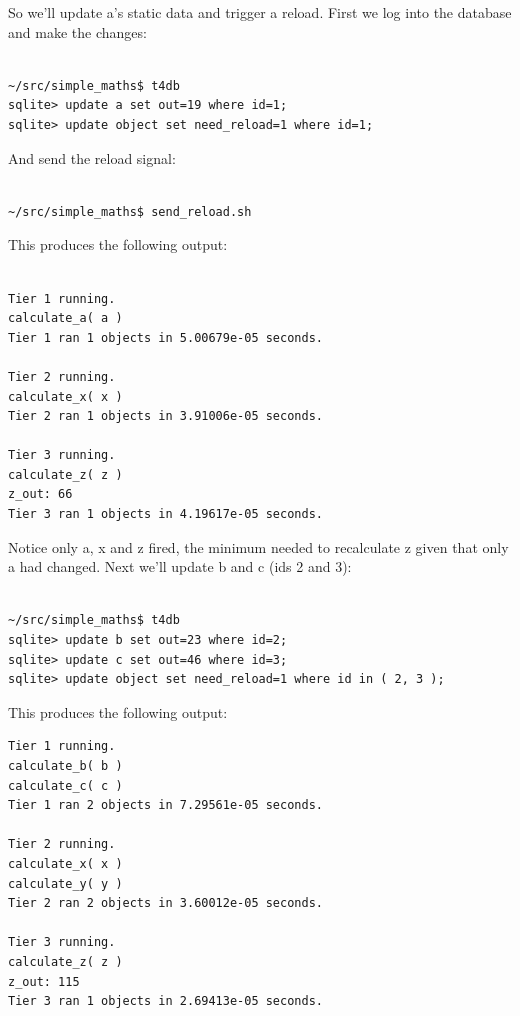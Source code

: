 \documentclass{report}
\begin{document}
So we'll update a's static data and trigger a reload. First we log into the database and make the changes:

\begin{verbatim}

~/src/simple_maths$ t4db
sqlite> update a set out=19 where id=1;
sqlite> update object set need_reload=1 where id=1;

\end{verbatim}

And send the reload signal:

\begin{verbatim}

~/src/simple_maths$ send_reload.sh

\end{verbatim}

This produces the following output:

\begin{verbatim}

Tier 1 running.
calculate_a( a )
Tier 1 ran 1 objects in 5.00679e-05 seconds.

Tier 2 running.
calculate_x( x )
Tier 2 ran 1 objects in 3.91006e-05 seconds.

Tier 3 running.
calculate_z( z )
z_out: 66
Tier 3 ran 1 objects in 4.19617e-05 seconds.

\end{verbatim}

Notice only a, x and z fired, the minimum needed to recalculate z given that only a had changed. Next we'll update b and c (ids 2 and 3):

\begin{verbatim}

~/src/simple_maths$ t4db
sqlite> update b set out=23 where id=2;
sqlite> update c set out=46 where id=3;
sqlite> update object set need_reload=1 where id in ( 2, 3 );

\end{verbatim}

This produces the following output:

\begin{verbatim}
Tier 1 running.
calculate_b( b )
calculate_c( c )
Tier 1 ran 2 objects in 7.29561e-05 seconds.

Tier 2 running.
calculate_x( x )
calculate_y( y )
Tier 2 ran 2 objects in 3.60012e-05 seconds.

Tier 3 running.
calculate_z( z )
z_out: 115
Tier 3 ran 1 objects in 2.69413e-05 seconds.
\end{verbatim}
\end{document}
